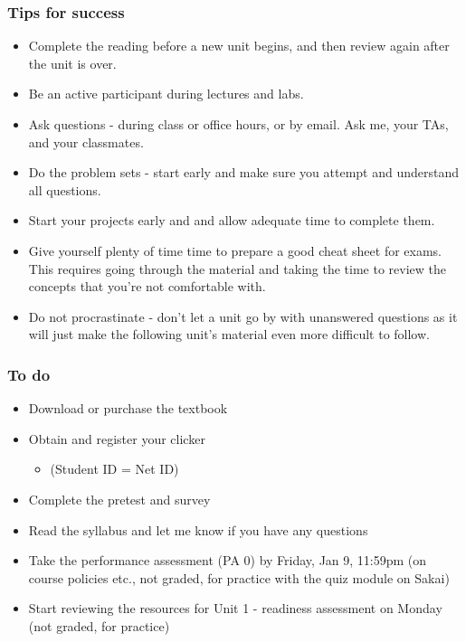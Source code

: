 \documentclass[11pt,containsverbatim,handout,xcolor=xelatex,dvipsnames,table]{beamer}
\begin{document}
\begin{frame}
\frametitle{Tips for success}

{\footnotesize
\begin{itemize}[<alert@+>]
\item Complete the reading before a new unit begins, and then review again after the unit is over.
\item Be an active participant during lectures and labs.
\item Ask questions - during class or office hours, or by email. Ask me, your TAs, and your classmates.
\item Do the problem sets - start early and make sure you attempt and understand all questions.
\item Start your projects early and and allow adequate time to complete them.
\item Give yourself plenty of time time to prepare a good cheat sheet for exams. This requires going through the material and taking the time to review the concepts that you're not comfortable with.
\item Do not procrastinate - don't let a unit go by with unanswered questions as it will just make the following unit's material even more difficult to follow. 
\end{itemize}
}

\end{frame}


\begin{frame}
\frametitle{To do}

\begin{itemize}

\item Download or purchase the textbook

\item Obtain and register your clicker
\begin{itemize}
\item {} (Student ID = Net ID)
\end{itemize}

\item Complete the pretest and survey

\item Read the syllabus and let me know if you have any questions

\item Take the performance assessment (PA 0) by Friday, Jan 9, 11:59pm (on course policies etc., not graded, for practice with the quiz module on Sakai)

\item Start reviewing the resources for Unit 1 - readiness assessment on Monday (not graded, for practice)

\end{itemize}

\end{frame}
\end{document}
